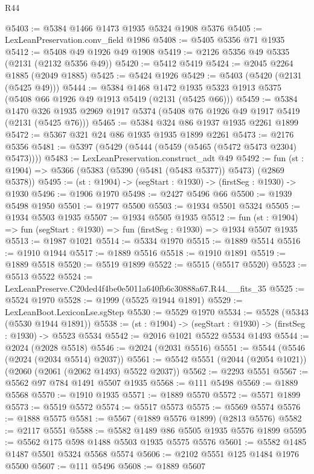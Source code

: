 \begin{lexlean}{R44}
\begin{coremodule}
@5403 := @5384 @1466 @1473 @1935 @5324 @1908 @5376
@5405 := LexLeanPreservation.conv_field @1986
@5408 := @5405 @5356 @71 @1935
@5412 := @5408 @49 @1926 @49 @1908
@5419 := @2126 @5356 @49 @5335 (@2131 (@2132 @5356 @49))
@5420 := @5412 @5419
@5424 := @2045 @2264 @1885 (@2049 @1885)
@5425 := @5424 @1926
@5429 := @5403 (@5420 (@2131 (@5425 @49)))
@5444 := @5384
    @1468
    @1472
    @1935
    @5323
    @1913
    @5375
    (@5408 @66 @1926 @49 @1913 @5419 (@2131 (@5425 @66)))
@5459 := @5384
    @1470
    @326
    @1935
    @2969
    @1917
    @5374
    (@5408 @76 @1926 @49 @1917 @5419 (@2131 (@5425 @76)))
@5465 := @5384 @324 @86 @1937 @1935 @2261 @1899
@5472 := @5367 @321 @24 @86 @1935 @1935 @1899 @2261
@5473 := @2176 @5356
@5481 := @5397 (@5429 (@5444 (@5459 (@5465 (@5472 @5473 @2304) @5473))))
@5483 := LexLeanPreservation.construct_adt @49
@5492 := fun (st : @1904) => @5366 (@5383 (@5390 (@5481 (@5483 @5377)) @5473) (@2869 @5378))
@5495 := (st : @1904) -> (segStart : @1930) -> (firstSeg : @1930) -> @1930
@5496 := @1906 @1970
@5498 := @2427 @5496 @66
@5500 := @1939 @5498 @1950
@5501 := @1977 @5500
@5503 := @1934 @5501 @5324
@5505 := @1934 @5503 @1935
@5507 := @1934 @5505 @1935
@5512 := fun (st : @1904) => fun (segStart : @1930) => fun (firstSeg : @1930) => @1934 @5507 @1935
@5513 := @1987 @1021
@5514 := @5334 @1970
@5515 := @1889 @5514
@5516 := @1910 @1944
@5517 := @1889 @5516
@5518 := @1910 @1891
@5519 := @1889 @5518
@5520 := @5519 @1899
@5522 := @5515 (@5517 @5520)
@5523 := @5513 @5522
@5524 := LexLeanPreserve.C20ded4f4be0e5011a640fb6c30888a67.R44.__fits_35
@5525 := @5524 @1970
@5528 := @1999 (@5525 @1944 @1891)
@5529 := LexLeanBoot.LexiconLse.sgStep
@5530 := @5529 @1970
@5534 := @5528 (@5343 (@5530 @1944 @1891))
@5538 := (st : @1904) -> (segStart : @1930) -> (firstSeg : @1930) -> @5523 @5534
@5542 := @2016 @1021 @5522 @5534 @1493
@5544 := @2024 (@2028 @5518)
@5546 := @2024 (@2031 @5516)
@5551 := @5544 (@5546 (@2024 (@2034 @5514) @2037))
@5561 := @5542 @5551 (@2044 (@2054 @1021)) (@2060 (@2061 (@2062 @1493) @5522 @2037))
@5562 := @2293 @5551
@5567 := @5562 @97 @784 @1491 @5507 @1935
@5568 := @111 @5498
@5569 := @1889 @5568
@5570 := @1910 @1935
@5571 := @1889 @5570
@5572 := @5571 @1899
@5573 := @5519 @5572
@5574 := @5517 @5573
@5575 := @5569 @5574
@5576 := @1888 @5575
@5581 := @5567 (@1889 @5576 @1899) (@2813 @5576)
@5582 := @2117 @5551
@5588 := @5582 @1489 @86 @5505 @1935 @5576 @1899
@5595 := @5562 @175 @598 @1488 @5503 @1935 @5575 @5576
@5601 := @5582 @1485 @1487 @5501 @5324 @5568 @5574
@5606 := @2102 @5551 @125 @1484 @1976 @5500
@5607 := @111 @5496
@5608 := @1889 @5607

\end{coremodule}
\end{lexlean}
